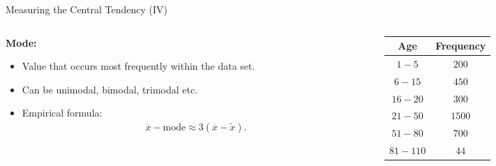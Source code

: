 \begin{frame}{Measuring the Central Tendency (IV)}
  \begin{columns}
    \begin{column}{0.6\textwidth}
      \textbf{Mode:}
      \begin{itemize}[noitemsep]
      \item Value that occurs most frequently within the data set.
      \item Can be unimodal, bimodal, trimodal etc.
      \item Empirical formula:
        \begin{align}
          \overline{x} - \text{mode} \approx 3(\overline{x}- \tilde{x}).
        \end{align}
      \end{itemize}
    \end{column}
    \begin{column}{0.3\textwidth}  %
      \begin{table}
        \begin{tabular}{|c|c|}
          Age & Frequency \\ \hline
          $1-5$ & $200$ \\
          $6-15$ & $450$ \\
          $16-20$ & $300$ \\
          $21-50$ & $1500$ \\
          $51-80$ & $700$ \\
          $81-110$ & $44$
        \end{tabular}\\[0.5cm]
      \end{table}
    \end{column}
  \end{columns}
\end{frame}


